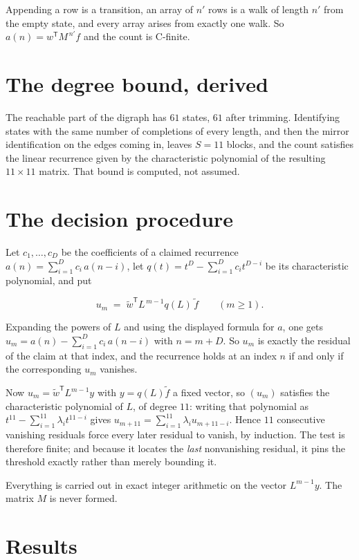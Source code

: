 \documentclass[11pt]{article}
\theoremstyle{definition}
\begin{document}
Appending a row is a transition, an array of $n'$ rows is a walk of length $n'$ from the empty state, and every array arises from exactly one walk. So $a(n) = w^{\mathsf T}M^{\,n'}f$ and the count is C-finite.

\section{The degree bound, derived}

The reachable part of the digraph has $61$ states, $61$ after trimming. Identifying states with the same number of completions of every length, and then the mirror identification on the edges coming in, leaves $S = 11$ blocks, and the count satisfies the linear recurrence given by the characteristic polynomial of the resulting $11\times11$ matrix. That bound is computed, not assumed.

\section{The decision procedure}

Let $c_1,\dots,c_D$ be the coefficients of a claimed recurrence $a(n) = \sum_{i=1}^{D} c_i\,a(n-i)$, let $q(t) = t^{D} - \sum_{i=1}^{D} c_i t^{D-i}$ be its characteristic polynomial, and put

\[u_m \;=\; \tilde w^{\mathsf T} L^{\,m-1} q(L)\,\tilde f \qquad (m \ge 1).\]

Expanding the powers of $L$ and using the displayed formula for $a$, one gets $u_m = a(n) - \sum_{i=1}^{D} c_i\,a(n-i)$ with $n = m + D$. So $u_m$ is exactly the residual of the claim at that index, and the recurrence holds at an index $n$ if and only if the corresponding $u_m$ vanishes.

Now $u_m = \tilde w^{\mathsf T} L^{m-1} y$ with $y = q(L)\tilde f$ a fixed vector, so $(u_m)$ satisfies the characteristic polynomial of $L$, of degree $11$: writing that polynomial as $t^{11} - \sum_{i=1}^{11} \lambda_i t^{11-i}$ gives $u_{m+11} = \sum_{i=1}^{11} \lambda_i u_{m+11-i}$. Hence $11$ consecutive vanishing residuals force every later residual to vanish, by induction. The test is therefore finite; and because it locates the {\itshape last} nonvanishing residual, it pins the threshold exactly rather than merely bounding it.

Everything is carried out in exact integer arithmetic on the vector $L^{m-1}y$. The matrix $M$ is never formed.

\section{Results}
\end{document}
